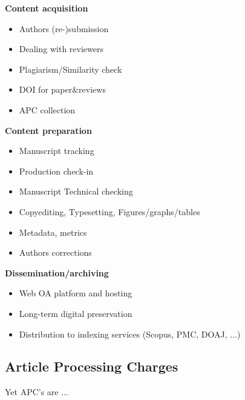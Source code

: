 \documentclass[10pt,compress,serif,aspectratio=169]{beamer}
\begin{document}
\begin{frame}[t]%
 \vskip1cm%

 \begin{minipage}{.45\textwidth}
   \textbf{Content acquisition}
   \begin{itemize}
   \item Authors (re-)submission
   \item Dealing with reviewers
   \item Plagiarism/Similarity check
   \item DOI for paper\&reviews
   \item APC collection
   \end{itemize}
 \end{minipage}
 \hfill
   \pause
 \begin{minipage}{.45\textwidth}
   \textbf{Content preparation}
   \begin{itemize}
   \item Manuscript tracking
   \item Production check-in
   \item Manuscript Technical checking
   \item Copyediting, Typesetting, Figures/graphs/tables
   \item Metadata, metrics
   \item Authors corrections
   \end{itemize}
\end{minipage}
\vfill
\pause
\begin{center}
 \begin{minipage}{.7\textwidth}
  \textbf{Dissemination/archiving}
  \begin{itemize}
  \item Web OA platform and hosting
  \item Long-term digital preservation
  \item Distribution to indexing services (Scopus, PMC, DOAJ, ...)
  \end{itemize}
\end{minipage}
\end{center}
\end{frame}


\subsection{Article Processing Charges}
\begin{frame}[t]%
 \vskip1cm%

 \begin{center}
 \alert{\Large Yet APC's are ...}\\
 \end{center}

 \pause
\end{frame}
\end{document}
